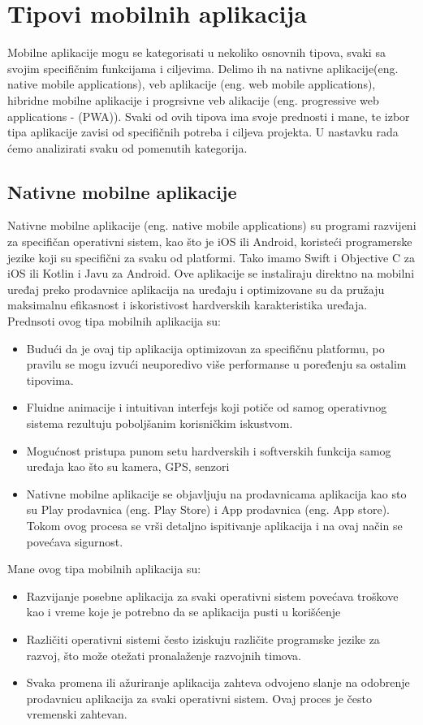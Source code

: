 \documentclass[12pt,oneside]{memoir}
\begin{document}
\section{Tipovi mobilnih aplikacija}

Mobilne aplikacije mogu se kategorisati u nekoliko osnovnih tipova, svaki sa svojim specifičnim funkcijama i ciljevima. Delimo ih na nativne aplikacije(eng. native mobile applications), veb aplikacije (eng. web mobile applications), hibridne mobilne aplikacije i progrsivne veb alikacije (eng. progressive web applications - (PWA)). Svaki od ovih tipova ima svoje prednosti i mane, te izbor tipa aplikacije zavisi od specifičnih potreba i ciljeva projekta. U nastavku rada ćemo analizirati svaku od pomenutih kategorija.

\subsection{Nativne mobilne aplikacije}

Nativne mobilne aplikacije (eng. native mobile applications) su programi razvijeni za specifičan operativni sistem, kao što je iOS ili Android, koristeći programerske jezike koji su specifični za svaku od platformi. Tako imamo Swift i Objective C za iOS ili Kotlin i Javu za Android. Ove aplikacije se instaliraju direktno na mobilni uređaj preko prodavnice aplikacija na uređaju i optimizovane su da pružaju maksimalnu efikasnost i iskoristivost hardverskih karakteristika uređaja. Prednsoti ovog tipa mobilnih aplikacija su:

\begin{itemize}
    \item Budući da je ovaj tip aplikacija optimizovan za specifičnu platformu, po pravilu se mogu izvući neuporedivo više performanse u poređenju sa ostalim tipovima.
    \item Fluidne animacije i intuitivan interfejs koji potiče od samog operativnog sistema rezultuju poboljšanim korisničkim iskustvom.
    \item Mogućnost pristupa punom setu hardverskih i softverskih funkcija samog uređaja kao što su kamera, GPS, senzori
    \item Nativne mobilne aplikacije se objavljuju na prodavnicama aplikacija kao sto su Play prodavnica (eng. Play Store) i App prodavnica (eng. App store). Tokom ovog procesa se vrši detaljno ispitivanje aplikacija i na ovaj način se povećava sigurnost.
\end{itemize}
Mane ovog tipa mobilnih aplikacija su:
\begin{itemize}
    \item Razvijanje posebne aplikacija za svaki operativni sistem povećava troškove kao i vreme koje je potrebno da se aplikacija pusti u korišćenje
    \item Različiti operativni sistemi često iziskuju različite programske jezike za razvoj, što može otežati pronalaženje razvojnih timova.
    \item Svaka promena ili ažuriranje aplikacija zahteva odvojeno slanje na odobrenje prodavnicu aplikacija za svaki operativni sistem. Ovaj proces je često vremenski zahtevan.
\end{itemize}
\end{document}
